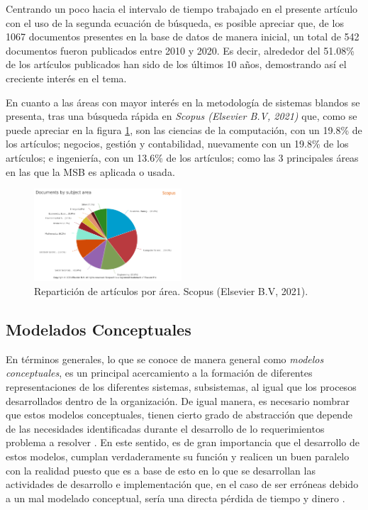 \documentclass[10pt,letterpaper,twoside,twocolumn]{article}   %
\begin{document}
Centrando un poco hacia el intervalo de tiempo trabajado en el presente artículo con el uso de la segunda ecuación de búsqueda, es posible apreciar que, de los 1067 documentos presentes en la base de datos de manera inicial, un total de 542 documentos fueron publicados entre 2010 y 2020. Es decir, alrededor del 51.08\% de los artículos publicados han sido de los últimos 10 años, demostrando así el creciente interés en el tema.

En cuanto a las áreas con mayor interés en la metodología de sistemas blandos se presenta, tras una búsqueda rápida en \textit{Scopus (Elsevier B.V, 2021)} que, como se puede apreciar en la figura \ref{subjectResults}, son las ciencias de la computación, con un 19.8\% de los artículos; negocios, gestión y contabilidad, nuevamente con un 19.8\% de los artículos; e ingeniería, con un 13.6\% de los artículos; como las 3 principales áreas en las que la MSB es aplicada o usada.

\begin{figure}
  \centering
      \includegraphics[width=0.49\textwidth]{Images/subjects.png}
  \caption{Repartición de artículos por área. Scopus (Elsevier B.V, 2021).}
  \label{subjectResults}
\end{figure}

\subsection{Modelados Conceptuales}
En términos generales, lo que se conoce de manera general como \textit{modelos conceptuales}, es un principal acercamiento a la formación de diferentes representaciones de los diferentes sistemas, subsistemas, al igual que los procesos desarrollados dentro de la organización. De igual manera, es necesario nombrar que estos modelos conceptuales, tienen cierto grado de abstracción que depende de las necesidades identificadas durante el desarrollo de lo requerimientos problema a resolver \cite{Adgeo[1]}. En este sentido, es de gran importancia que el desarrollo de estos modelos, cumplan verdaderamente su función y realicen un buen paralelo con la realidad puesto que es a base de esto en lo que se desarrollan las actividades de desarrollo e implementación que, en el caso de ser erróneas debido a un mal modelado conceptual, sería una directa pérdida de tiempo y dinero \cite{Pereira[1]}.
\end{document}
